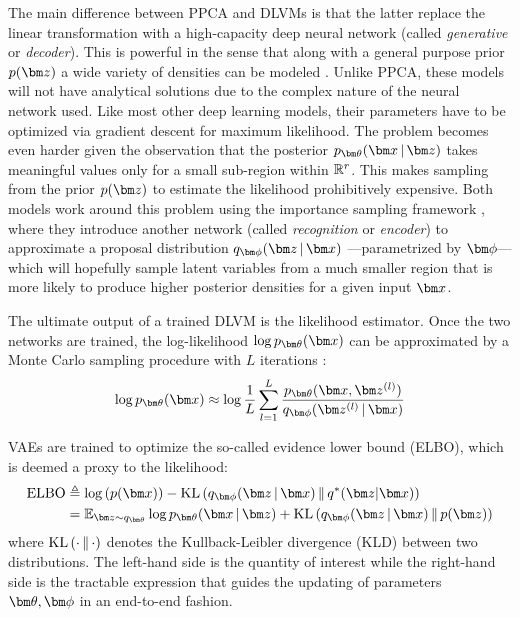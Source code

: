 \documentclass{scrartcl}
\theoremstyle{definition}
\begin{document}
The main difference between PPCA and DLVMs is that the latter replace the linear transformation with a high-capacity deep neural network (called \textit{generative} or \textit{decoder}).
This is powerful in the sense that along with a general purpose prior $\pz$ a wide variety of densities can be modeled \parencite{kingma2019introduction}.
Unlike PPCA, these models will not have analytical solutions due to the complex nature of the neural network used.
Like most other deep learning models, their parameters have to be optimized via gradient descent for maximum likelihood.
The problem becomes even harder given the observation that the posterior $\decoding$ takes meaningful values only for a small sub-region within $\mathbb{R}^{r}$.
This makes sampling from the prior $\pz$ to estimate the likelihood prohibitively expensive.
Both models work around this problem using the importance sampling framework \parencite[p. 532]{bishop2006pattern}, where they introduce another network (called \textit{recognition} or \textit{encoder}) to approximate a proposal distribution $\encoding$ ---parametrized by $\mbphi$--- which will hopefully sample latent variables from a much smaller region that is more likely to produce higher posterior densities for a given input $\mbx$. 

The ultimate output of a trained DLVM is the likelihood estimator.
Once the two networks are trained, the log-likelihood $\log \ptheta(\mbx)$ can be approximated by a Monte Carlo sampling procedure with $L$ iterations \parencite[p. 30]{kingma2019introduction}:
\begin{equation}
\label{eqn:SummationLL}
\log \ptheta(\mbx) \approx \log \frac{1}{L} \sum_{l=1}^{L}\frac{\ptheta(\mbx,\mbz^{(l)})}{\qphizgivenx{\mbz^{(l)}}{\mbx}}    
\end{equation}

VAEs are trained to optimize the so-called evidence lower bound (ELBO), which is deemed a proxy to the likelihood:
\begin{equation}
\label{eqn:VAELoss}
\begin{split}
    \text{ELBO} &\triangleq \log\left( p(\mbx) \right) - \KL{\encoding}{q^{*}(\mbz|\mbx)} \\ 
	&= \E_{\mbz \sim q_{\mbtheta}} \log \decoding + \KL{\encoding}{p(\mbz)}
\end{split}
\end{equation}
where $\textrm{KL}\left(\cdot\,\|\,\cdot\right)$ denotes the Kullback-Leibler divergence (KLD) between two distributions. 
The left-hand side is the quantity of interest while the right-hand side is the tractable expression that guides the updating of parameters $\mbtheta, \mbphi$ in an end-to-end fashion.
\end{document}
